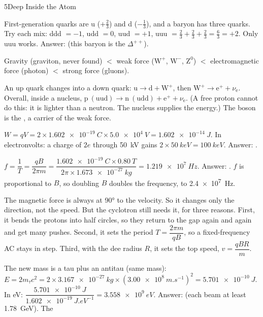 \begin{chapteranswers}{5}{Deep Inside the Atom}
  \item First-generation quarks are u ($+\tfrac23$) and d ($-\tfrac13$), and a baryon has
        three quarks. Try each mix: ddd $= -1$, udd $= 0$, uud $= +1$,
        uuu $= \tfrac23 + \tfrac23 + \tfrac23 = \tfrac63 = +2$. Only uuu works.
        Answer:  (this baryon is the $\Delta^{++}$).
  \item Gravity (graviton, never found) $<$ weak force ($\mathrm{W}^+$, $\mathrm{W}^-$,
        $\mathrm{Z}^0$) $<$ electromagnetic force (photon) $<$ strong force (gluons).
  \item An up quark changes into a down quark: $\mathrm{u} \to \mathrm{d} + \mathrm{W}^+$,
        then $\mathrm{W}^+ \to \mathrm{e}^+ + \nu_\mathrm{e}$. Overall, inside a nucleus,
        $\mathrm{p}\ (\mathrm{uud}) \to \mathrm{n}\ (\mathrm{udd}) + \mathrm{e}^+ +
        \nu_\mathrm{e}$. (A free proton cannot do this: it is lighter than a neutron. The
        nucleus supplies the energy.) The boson is the , a carrier
        of the weak force.
  \item $W = qV = 2 \times \qty{1.602e-19}{C} \times \qty{5.0e4}{V} = \qty{1.602e-14}{J}$.
        In electronvolts: a charge of $2e$ through \qty{50}{kV} gains
        $2 \times \qty{50}{keV} = \qty{100}{keV}$. Answer:
        .
  \item $f = \dfrac{1}{T} = \dfrac{qB}{2\pi m} = \dfrac{\qty{1.602e-19}{C} \times
        \qty{0.80}{T}}{2\pi \times \qty{1.673e-27}{kg}} = \qty{1.219e7}{Hz}$. Answer:
        . $f$ is proportional to $B$, so doubling $B$
        doubles the frequency, to \qty{2.4e7}{Hz}.
  \item The magnetic force is always at \ang{90} to the velocity. So it changes only the
        direction, not the speed. But the cyclotron still needs it, for three reasons.
        First, it bends the protons into half circles, so they return to the gap again and
        again and get many pushes. Second, it sets the period $T = \dfrac{2\pi m}{qB}$, so
        a fixed-frequency AC stays in step. Third, with the dee radius $R$, it sets the
        top speed, $v = \dfrac{qBR}{m}$.
  \item The new mass is a tau plus an antitau (same mass):
        $E = 2m_\tau c^2 = 2 \times \qty{3.167e-27}{kg} \times (\qty{3.00e8}{m.s^{-1}})^2
        = \qty{5.701e-10}{J}$. In eV:
        $\dfrac{\qty{5.701e-10}{J}}{\qty{1.602e-19}{J.eV^{-1}}} = \qty{3.558e9}{eV}$.
        Answer:  (each beam at least \qty{1.78}{GeV}). The

\end{chapteranswers}
